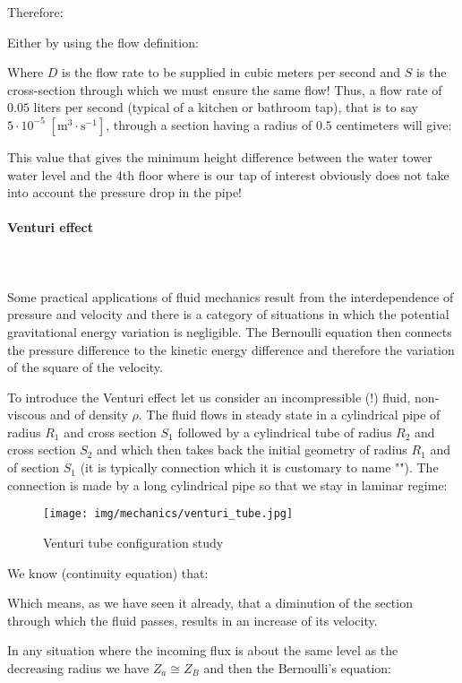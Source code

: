 	Therefore:
	
	Either by using the flow definition:
	
	Where $D$ is the flow rate to be supplied in cubic meters per second and $S$ is the cross-section through which we must ensure the same flow! Thus, a flow rate of $0.05$ liters per second (typical of a kitchen or bathroom tap), that is to say $5\cdot 10^{-5}\;[\text{m}^3\cdot \text{s}^{-1}]$, through a section having a radius of $0.5$ centimeters will give:
	
	This value that gives the minimum height difference between the water tower water level and the 4th floor where is our tap of interest obviously does not take into account the pressure drop in the pipe!
	
	\paragraph{Venturi effect}\mbox{}\\\\
	Some practical applications of fluid mechanics result from the interdependence of pressure and velocity and there is a category of situations in which the potential gravitational energy variation is negligible. The Bernoulli equation then connects the pressure difference to the kinetic energy difference and therefore the variation of the square of the velocity.

	To introduce the Venturi effect let us consider an incompressible (!) fluid, non-viscous and of density $\rho$. The fluid flows in steady state in a cylindrical pipe of radius $R_1$ and cross section $S_1$ followed by a cylindrical tube of radius $R_2$ and cross section $S_2$ and which then takes back the initial geometry of radius $R_1$ and of section $S_1$ (it is typically connection which it is customary to name ""). The connection is made by a long cylindrical pipe so that we stay in laminar regime:
	\begin{figure}[H]
		\centering
		\texttt{[image: img/mechanics/venturi\_tube.jpg]}
		\caption{Venturi tube configuration study}
	\end{figure}
	We know (continuity equation) that:
	
	Which means, as we have seen it already, that a diminution of the section through which the fluid passes, results in an increase of its velocity.

	In any situation where the incoming flux is about the same level as the decreasing radius we have $Z_a\cong Z_B$ and then the Bernoulli's equation:
	

